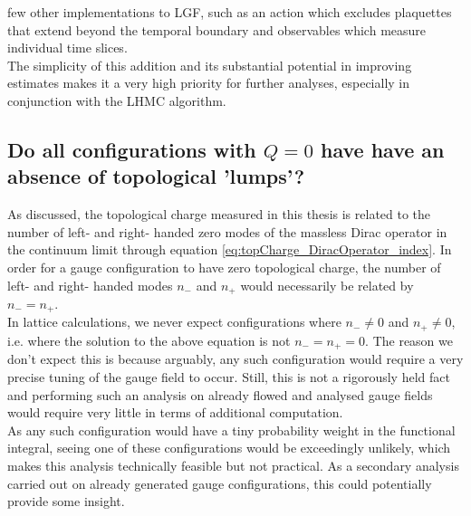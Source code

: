 \documentclass[a4paper,10pt]{book}
\begin{document}
few other implementations to LGF, such as an action which excludes plaquettes that extend beyond the temporal boundary and observables which measure individual time slices.\\The simplicity of this addition and its substantial potential in improving estimates makes it a very high priority for further analyses, especially in conjunction with the LHMC algorithm.



\subsection{Do all configurations with $Q=0$ have have an absence of topological 'lumps'?}
As discussed, the topological charge measured in this thesis is related to the number of left- and right- handed zero modes of the massless Dirac operator in the continuum limit through equation \eqref{eq:topCharge_DiracOperator_index}. In order for a gauge configuration to have zero topological charge, the number of left- and right- handed modes $n_-$ and $n_+$ would necessarily be related by $n_- = n_+$.\\In lattice calculations, we never expect configurations where $n_- \neq 0$ and $n_+ \neq 0$, i.e. where the solution to the above equation is not $n_- = n_+=0$. The reason we don't expect this is because arguably, any such configuration would require a very precise tuning of the gauge field to occur. Still, this is not a rigorously held fact and performing such an analysis on already flowed and analysed gauge fields would require very little in terms of additional computation.\\As any such configuration would have a tiny probability weight in the functional integral, seeing one of these configurations would be exceedingly unlikely, which makes this analysis technically feasible but not practical. As a secondary analysis carried out on already generated gauge configurations, this could potentially provide some insight.
\end{document}
